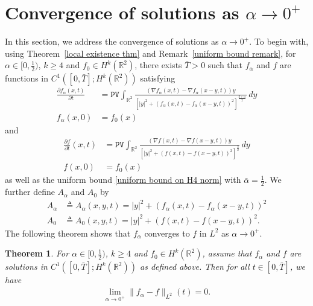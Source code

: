 \documentclass[reqno]{amsart}%
\newtheorem{thm}{Theorem}[section]
\theoremstyle{definition}
\theoremstyle{remark}
\numberwithin{equation}{section}
\newcommand{\0}{\mathbf{0}}
\newcommand{\1}{\mathbf{1}}
\newcommand{\R}{\mathbb R}
\newcommand{\PV}{\texttt{PV}}
\numberwithin{equation}{section}
\numberwithin{theorem}{section}
\numberwithin{figure}{section}
\begin{document}

\section{Convergence of solutions as $\alpha\to0^{+}$}\label{convergence for alpha section}

In this section, we address the convergence of solutions as $\alpha\to0^{+}$. To begin with, using Theorem~\ref{local existence thm} and Remark~\ref{uniform bound remark}, for $\alpha\in[0,\frac{1}{2})$, $k\ge4$ and $f_0\in H^k(\R^2)$, there exists $\bar{T}>0$ such that $f_\alpha$ and $f$ are functions in $C^1([0,\bar{T}];H^k(\R^2))$ satisfying
\begin{align*}
\frac{\partial f_{\alpha}(x,t)}{\partial t} &= \PV\int_{\mathbb{R}^2}  \frac{\left(\nabla f_{\alpha}(x,t) - \nabla f_{\alpha}(x-y,t)\right)y}{\left[|y|^{2} +\left( f_{\alpha}(x,t) - f_{\alpha}(x-y,t)\right)^2\right]^{\frac{3+\alpha}{2}}} \, dy \\
f_{\alpha}({x,0}) &= f_{0}(x)
\end{align*}
and
\begin{align*}
\frac{\partial f}{\partial t}(x,t) &= \PV\int_{\mathbb{R}^2}  \frac{\left(\nabla f(x,t) - \nabla f(x-y,t)\right)y}{\left[|y|^{2} +\left( f(x,t) - f(x-y,t)\right)^2\right]^{\frac{3}{2}}} \, dy \\
f(x,0) &= f_{0}(x)
\end{align*}
as well as the uniform bound \eqref{uniform bound on H4 norm} with $\bar{\alpha}=\frac{1}{2}$. We further define $A_\alpha$ and $A_{0}$ by
\begin{align*} 
A_{\alpha} &\triangleq A_{\alpha}(x,y,t) = |y|^{2}+(f_{\alpha}(x, t)-f_{\alpha}(x-y, t))^{2} \\
A_{0} &\triangleq A_{0}(x,y,t) = |y|^{2}+(f(x, t)-f(x-y, t))^{2}.
\end{align*}
The following theorem shows that $f_\alpha$ converges to $f$ in $L^2$ as $\alpha\to0^+$.
\begin{thm}\label{L2 convergence thm}
For $\alpha\in[0,\frac{1}{2})$, $k\ge4$ and $f_0\in H^k(\R^2)$, assume that $f_\alpha$ and $f$ are solutions in $C^1([0,\bar{T}];H^k(\R^2))$ as defined above. Then for all $t\in[0,\bar{T}]$, we have
\begin{align}\label{L2 convergence}
\lim_{\alpha\to0^+}\|f_\alpha - f\|_{L^2}(t)=0.
\end{align}
\end{thm}
\end{document}
